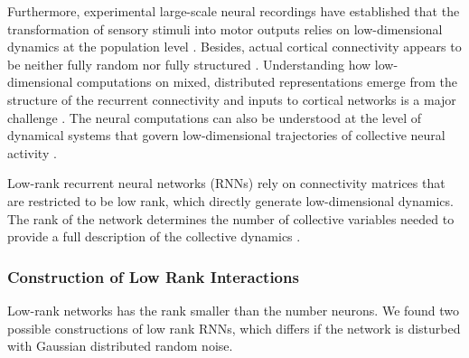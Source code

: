 \documentclass[11pt]{article}
\begin{document}
	Furthermore, experimental large-scale neural recordings have established that the transformation of sensory stimuli into motor outputs relies on low-dimensional dynamics at the population level \cite{mastrogiuseppe2018linking}. Besides, actual cortical connectivity appears to be neither fully random nor fully structured \cite{harris2013cortical}. Understanding how low-dimensional computations on mixed, distributed representations emerge from the structure of the recurrent connectivity and inputs to cortical networks is a major challenge \cite{mastrogiuseppe2018linking}. The neural computations can also be understood at the level of dynamical systems that govern low-dimensional trajectories of collective neural activity \cite{beiran2021shaping}. 
	
	Low-rank recurrent neural networks (RNNs) rely on connectivity matrices that are restricted to be low rank, which directly generate low-dimensional dynamics. The rank of the network determines the number of collective variables needed to provide a full description of the collective dynamics \cite{beiran2021shaping}. 
	
	\subsubsection{Construction of Low Rank Interactions} \label{sec:low_rank_construct}
	Low-rank networks has the rank smaller than the number neurons. We found two possible constructions of low rank RNNs, which differs if the network is disturbed with Gaussian distributed random noise. 
\end{document}
